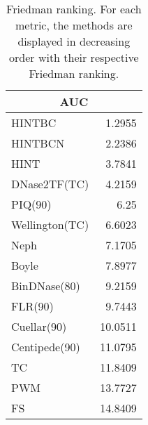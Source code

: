 \documentclass[landscape, 6pt]{report}
\begin{document}
\begin{table}[h!]
\label{tab:ranking}
\vspace{0.0cm}
\begin{center}
\caption{Friedman ranking. For each metric, the methods are displayed in decreasing order with their respective Friedman ranking.}
\renewcommand{\arraystretch}{1.2}
  \begin{tabular}{ |lr| }
    \hline
    \multicolumn{2}{|c|}{\textbf{AUC}} \\
    \hline
    HINTBC & 1.2955 \\
    HINTBCN & 2.2386 \\
    HINT & 3.7841 \\
    DNase2TF(TC) & 4.2159 \\
    PIQ(90) & 6.25 \\
    Wellington(TC) & 6.6023 \\
    Neph & 7.1705 \\
    Boyle & 7.8977 \\
    BinDNase(80) & 9.2159 \\
    FLR(90) & 9.7443 \\
    Cuellar(90) & 10.0511 \\
    Centipede(90) & 11.0795 \\
    TC & 11.8409 \\
    PWM & 13.7727 \\
    FS & 14.8409 \\
    \hline
  \end{tabular}
\end{center}
\vspace{0.0cm}
\end{table}
\end{document}
